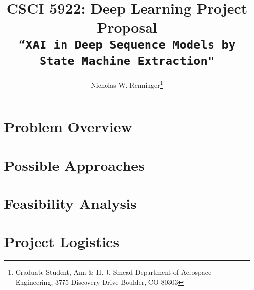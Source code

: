 

\title{CSCI 5922: Deep Learning Project Proposal \\ \large{\texttt{``XAI in Deep Sequence Models by State Machine Extraction"}}}

\author{
Nicholas W. Renninger\footnote{Graduate Student, Ann \& H. J. Smead Department of Aerospace Engineering, 3775 Discovery Drive
Boulder, CO 80303}}



\maketitle

% 

\section{Problem Overview}


\section{Possible Approaches}
\label{sec: approaches}


\section{Feasibility Analysis}
\label{sec: Feasibility}


\section{Project Logistics}




% 


